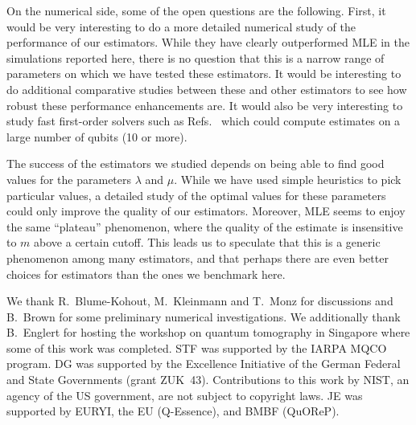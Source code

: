 On the numerical side, some of the open questions are the following. First, it would be very interesting to do a more detailed numerical study of the performance of our estimators. While they have clearly outperformed MLE in the simulations reported here, there is no question that this is a narrow range of parameters on which we have tested these estimators. It would be interesting to do additional comparative studies between these and other estimators to see how robust these performance enhancements are. It would also be very interesting to study fast first-order solvers such as Refs.~\cite{Cai2010,Becker2010,Ma2011} which could compute estimates on a large number of qubits (10 or more). 

The success of the estimators we studied depends on being able to find good values for the parameters $\lambda$ and $\mu$. While we have used simple heuristics to pick particular values, a detailed study of the optimal values for these parameters could only improve the quality of our estimators. Moreover, MLE seems to enjoy the same ``plateau'' phenomenon, where the quality of the estimate is insensitive to $m$ above a certain cutoff. This leads us to speculate that this is a generic phenomenon among many estimators, and that perhaps there are even better choices for estimators than the ones we benchmark here.


\acknowledgements


We thank R.~Blume-Kohout, M.~Kleinmann and T.~Monz for discussions and B.~Brown for some preliminary numerical investigations. We additionally thank B.~Englert for hosting the workshop on quantum tomography in Singapore where some of this work was completed. STF was supported by the IARPA MQCO program. DG was supported by the Excellence Initiative of the German Federal and State Governments (grant ZUK~43). Contributions to this work by NIST, an agency of the US government, are not subject to copyright laws. JE was supported by EURYI, the EU (Q-Essence), and BMBF (QuOReP).
